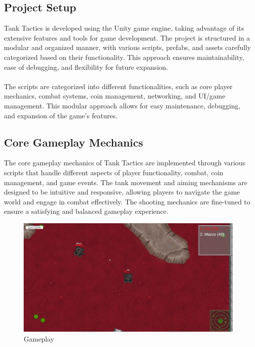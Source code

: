 \subsection{Project Setup}
Tank Tactics is developed using the Unity game engine, taking advantage of its extensive features and tools for game development. The project is structured in a modular and organized manner, with various scripts, prefabs, and assets carefully categorized based on their functionality. This approach ensures maintainability, ease of debugging, and flexibility for future expansion.
\\
\noindent
\\
The scripts are categorized into different functionalities, such as core player mechanics, combat systems, coin management, networking, and UI/game management. This modular approach allows for easy maintenance, debugging, and expansion of the game's features.

\subsection{Core Gameplay Mechanics}
The core gameplay mechanics of Tank Tactics are implemented through various scripts that handle different aspects of player functionality, combat, coin management, and game events. The tank movement and aiming mechanisms are designed to be intuitive and responsive, allowing players to navigate the game world and engage in combat effectively. The shooting mechanics are fine-tuned to ensure a satisfying and balanced gameplay experience.
\\

\begin{figure}[h]
    \centering
    \begin{minipage}{0.49\textwidth}
    \centering
    \includegraphics[width=1\textwidth]{figures/GamePlay.png}
    \caption{Gameplay}
    \label{fig:player_gameplay}
    \end{minipage}
\end{figure}

